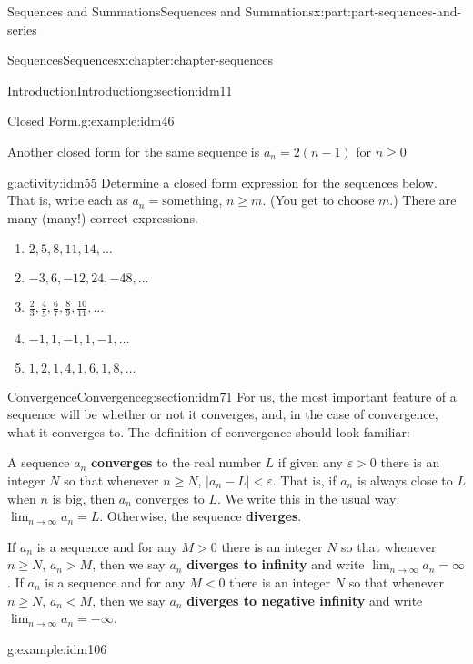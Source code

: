 \documentclass[oneside,10pt,]{book}
\newcommand{\terminology}[1]{\textbf{#1}}
\begin{document}
\begin{partptx}{Sequences and Summations}{}{Sequences and Summations}{}{}{x:part:part-sequences-and-series}
\begin{chapterptx}{Sequences}{}{Sequences}{}{}{x:chapter:chapter-sequences}
\begin{sectionptx}{Introduction}{}{Introduction}{}{}{g:section:idm11}
\begin{example}{Closed Form.}{g:example:idm46}
\par
Another closed form for the same sequence is \(a_n = 2(n-1)\) for \(n \geq 0\)%
\end{example}
\begin{activity}{}{g:activity:idm55}%
Determine a closed form expression for the sequences below. That is, write each as \(a_n = \textrm{something}\), \(n \geq m\). (You get to choose \(m\).) There are many (many!) correct expressions.%
\begin{enumerate}[font=\bfseries,label=(\alph*),ref=\alph*]
\item{}\(2, 5, 8, 11, 14, \dots\)\item{}\(-3, 6, -12, 24, -48, \dots\)\item{}\(\frac{2}{3}, \frac{4}{5}, \frac{6}{7}, \frac{8}{9}, \frac{10}{11}, \dots\)\item{}\(-1, 1, -1, 1, -1, \dots\)\item{}\(1, 2, 1, 4, 1, 6, 1, 8, \dots\)\end{enumerate}
\end{activity}
\end{sectionptx}
%
%
\typeout{************************************************}
\typeout{************************************************}
%
\begin{sectionptx}{Convergence}{}{Convergence}{}{}{g:section:idm71}
For us, the most important feature of a sequence will be whether or not it converges, and, in the case of convergence, what it converges to. The definition of convergence should look familiar:%
\par
A sequence \(a_n\) \terminology{converges} to the real number \(L\) if given any \(\varepsilon > 0\) there is an integer \(N\) so that whenever \(n \geq N\), \(|a_n - L| < \varepsilon\). That is, if \(a_n\) is always close to \(L\) when \(n\) is big, then \(a_n\) converges to \(L\). We write this in the usual way: \(\displaystyle\lim_{n \to \infty}a_n = L\). Otherwise, the sequence \terminology{diverges}.%
\par
If \(a_n\) is a sequence and for any \(M > 0\) there is an integer \(N\) so that whenever \(n \geq N\), \(a_n > M\), then we say \(a_n\) \terminology{diverges to infinity} and write \(\displaystyle\lim_{n \to \infty}a_n = \infty\). If \(a_n\) is a sequence and for any \(M < 0\) there is an integer \(N\) so that whenever \(n \geq N\), \(a_n < M\), then we say \(a_n\) \terminology{diverges to negative infinity} and write \(\displaystyle\lim_{n \to \infty}a_n = -\infty\).%
\begin{example}{}{g:example:idm106}%

\end{example}
\end{sectionptx}
\end{chapterptx}
\end{partptx}
\end{document}
